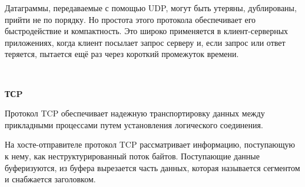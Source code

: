 \documentclass{article}
\begin{document}
Датаграммы, передаваемые с помощью UDP, могут быть утеряны, дублированы, прийти не по порядку. Но простота этого протокола обеспечивает его быстродействие и компактность.
Это широко применяется в клиент-серверных приложениях, когда клиент посылает запрос серверу и, если запрос или ответ теряется, пытается ещё раз через короткий промежуток времени.

~\

\newpage

\textbf{ТСP}

Протокол TCP обеспечивает надежную транспортировку данных между прикладными процессами путем установления логического соединения. 

На хосте-отправителе протокол TCP рассматривает информацию, поступающую к нему, как неструктурированный поток байтов. Поступающие данные буферизуются, из буфера вырезается часть данных, которая называется сегментом и снабжается заголовком.

~\

\begin{figure}[h]
\end{figure}
\end{document}
